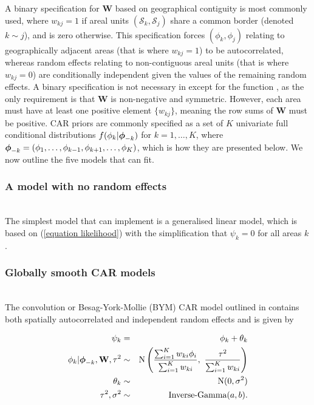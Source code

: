 \documentclass[article,shortnames,nojss]{jss}
\newcommand{\bd}[1]{\ensuremath{\mbox{\boldmath $#1$}}}
\begin{document}
\hspace{1cm} A binary specification for  $\mathbf{W}$ based on geographical contiguity is most commonly used, where $w_{kj}=1$ if areal units $(\mathcal{S}_k, \mathcal{S}_j)$ share a common border (denoted $k\sim j$), and is zero otherwise. This specification forces $(\phi_k, \phi_j)$ relating to geographically adjacent areas (that is where $w_{kj}=1$) to be autocorrelated, whereas random effects relating to non-contiguous areal units (that is where $w_{kj}=0$) are conditionally independent given the values of the remaining random effects. A binary specification is not necessary in  except for the function , as the only requirement is that $\mathbf{W}$ is non-negative and symmetric. However, each area must have at least one positive element $\{w_{kj}\}$, meaning the row sums of $\mathbf{W}$  must be positive. CAR priors are commonly specified as a set of $K$ univariate full conditional distributions $f(\phi_{k}|\bd{\phi}_{-k})$ for $k=1,\ldots,K$, where $\bd{\phi}_{-k}=(\phi_{1},\ldots,\phi_{k-1},\phi_{k+1},\ldots,\phi_{K})$, which is how they are presented below. We now outline the five models that  can fit.\\

\subsubsection{A model with no random effects}
\\
The simplest model that  can implement is a generalised linear model, which is based on (\ref{equation likelihood}) with the simplification that $\psi_k=0$ for all areas $k$. 

\subsubsection{Globally smooth CAR models}
\\
The  convolution or Besag-York-Mollie (BYM) CAR model outlined in \cite{besag1991} contains both spatially autocorrelated and independent random effects and is given by 


\begin{eqnarray}
\psi_k&=&\phi_{k} + \theta_k\label{equation intrinsic}\\
\phi_{k}| \bd{\phi}_{-k},\mathbf{W},\tau^2&\sim&\mbox{N}\left(\frac{\sum_{i=1}^{K}w_{ki}\phi_{i}}{\sum_{i=1}^{K}w_{ki}},~
\frac{\tau^{2}}{\sum_{i=1}^{K}w_{ki}}\right)\nonumber\\
\theta_k&\sim&\mbox{N}(0, \sigma^2)\nonumber\\
\tau^{2}, \sigma^2&\sim&\mbox{Inverse-Gamma}(a, b).\nonumber
\end{eqnarray}
\end{document}
